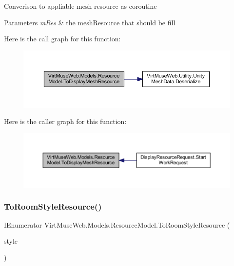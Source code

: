 Converison to appliable mesh resource as coroutine 


\begin{DoxyParams}{Parameters}
{\em m\+Res} & the mesh\+Resource that should be fill\\
\hline
\end{DoxyParams}
Here is the call graph for this function\+:
\nopagebreak
\begin{figure}[H]
\begin{center}
\leavevmode
\includegraphics[width=350pt]{class_virt_muse_web_1_1_models_1_1_resource_model_a57f31b86ab776544b1f5480d7efc1a9c_cgraph}
\end{center}
\end{figure}
Here is the caller graph for this function\+:
\nopagebreak
\begin{figure}[H]
\begin{center}
\leavevmode
\includegraphics[width=350pt]{class_virt_muse_web_1_1_models_1_1_resource_model_a57f31b86ab776544b1f5480d7efc1a9c_icgraph}
\end{center}
\end{figure}
\mbox{\label{class_virt_muse_web_1_1_models_1_1_resource_model_ae85d25e8e130285ea18964b535f82f41}} 
\subsubsection{\texorpdfstring{To\+Room\+Style\+Resource()}{ToRoomStyleResource()}}
{\footnotesize\ttfamily I\+Enumerator Virt\+Muse\+Web.\+Models.\+Resource\+Model.\+To\+Room\+Style\+Resource (\begin{DoxyParamCaption}\item[{\mbox{\hyperlink{class_room_style_resource}{Room\+Style\+Resource}}}]{style }\end{DoxyParamCaption})}

